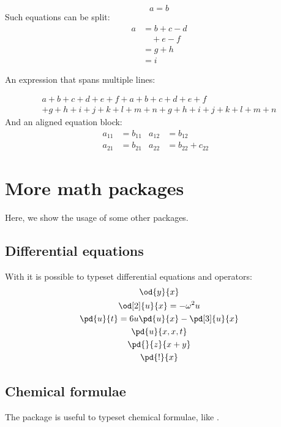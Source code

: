 \begin{equation}\label{eq:equation}
	a = b
\end{equation}
Such equations can be split:
\begin{equation}
	\begin{split}
		a& = b+c-d\\
		& \quad + e - f\\
		& = g+h\\
		& = i
	\end{split}
\end{equation}

An expression that spans multiple lines:

\begin{multline}
	a + b + c +d + e + f + a + b + c +d + e + f \\
	+ g + h + i + j + k + l + m + n+ g + h + i + j + k + l + m + n
\end{multline}
And an aligned equation block:
\begin{align}
	a_{11} & = b_{11}          &
	a_{12} & = b_{12}          & \\
	a_{21} & = b_{21}          &
	a_{22} & = b_{22} + c_{22}
\end{align}

\section{More math packages}
Here, we show the usage of some other packages.
\subsection{Differential equations}
With  it is possible to typeset differential equations and operators:
\begin{gather}
	\od{y}{x}\\
	\od[2]{u}{x} = -\omega^2 u\\
	\pd{u}{t} = 6u \pd{u}{x} - \pd[3]{u}{x}\\
	\pd{u}{x,x,t}\\
	\pd{}{z}{x+y}\\
	\pd{!}{x}
\end{gather}

\subsection{Chemical formulae}
The package  is useful to typeset chemical formulae, like .

